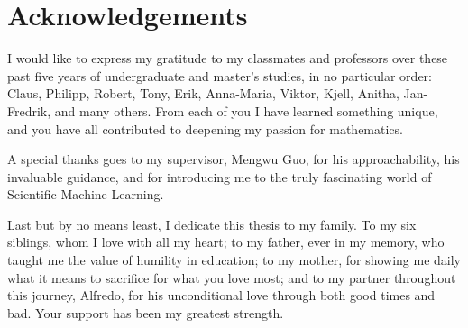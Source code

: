 {\addvspace{1.3cm}

 
 \chapter*{Acknowledgements}

		


\addvspace{-1.5cm}




I would like to express my gratitude to my classmates and professors over these past five years of undergraduate and master’s studies, in no particular order: Claus, Philipp, Robert, Tony, Erik, Anna-Maria, Viktor, Kjell, Anitha, Jan-Fredrik, and many others. From each of you I have learned something unique, and you have all contributed to deepening my passion for mathematics.

A special thanks goes to my supervisor, Mengwu Guo, for his approachability, his invaluable guidance, and for introducing me to the truly fascinating world of Scientific Machine Learning. 

Last but by no means least, I dedicate this thesis to my family. To my six siblings, whom I love with all my heart; to my father, ever in my memory, who taught me the value of humility in education; to my mother, for showing me daily what it means to sacrifice for what you love most; and to my partner throughout this journey, Alfredo, for his unconditional love through both good times and bad. Your support has been my greatest strength.


}